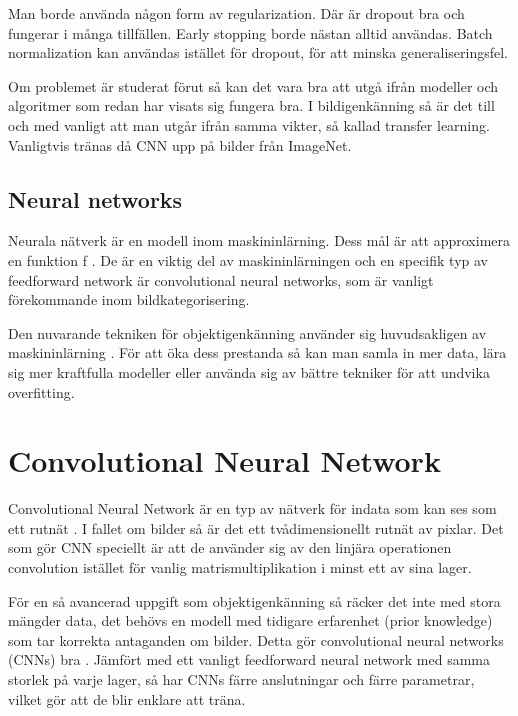 \documentclass{kththesis}
\begin{document}
  Man borde använda någon form av regularization. Där är dropout bra och fungerar i många tillfällen. Early stopping borde nästan alltid användas. Batch normalization kan användas istället för dropout, för att minska generaliseringsfel. 

  Om problemet är studerat förut så kan det vara bra att utgå ifrån modeller och algoritmer som redan har visats sig fungera bra. I bildigenkänning så är det till och med vanligt att man utgår ifrån samma vikter, så kallad transfer learning. Vanligtvis tränas då CNN upp på bilder från ImageNet. 

    \subsection{Neural networks}
    Neurala nätverk är en modell inom maskininlärning. Dess mål är att approximera en funktion f \parencite{Goodfellow-et-al-2016}. De är en viktig del av maskininlärningen och en specifik typ av feedforward network är convolutional neural networks, som är vanligt förekommande inom bildkategorisering. 

    Den nuvarande tekniken för objektigenkänning använder sig huvudsakligen av maskininlärning \parencite{krizhevsky_imagenet_2012}. För att öka dess prestanda så kan man samla in mer data, lära sig mer kraftfulla modeller eller använda sig av bättre tekniker för att undvika overfitting.

  \section{Convolutional Neural Network}
  Convolutional Neural Network är en typ av nätverk för indata som kan ses som ett rutnät \parencite{Goodfellow-et-al-2016}. I fallet om bilder så är det ett tvådimensionellt rutnät av pixlar. Det som gör CNN speciellt är att de använder sig av den linjära operationen convolution istället för vanlig matrismultiplikation i minst ett av sina lager.

  För en så avancerad uppgift som objektigenkänning så räcker det inte med stora mängder data, det behövs en modell med tidigare erfarenhet (prior knowledge) som tar korrekta antaganden om bilder. Detta gör convolutional neural networks (CNNs) bra \parencite{krizhevsky_imagenet_2012}. Jämfört med ett vanligt feedforward neural network med samma storlek på varje lager, så har CNNs färre anslutningar och färre parametrar, vilket gör att de blir enklare att träna.
\end{document}
